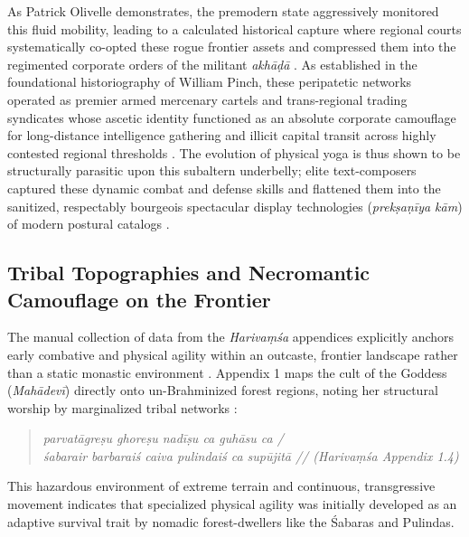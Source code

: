\documentclass[11pt,twoside,letterpaper]{article}
\begin{document}
As Patrick Olivelle demonstrates, the premodern state aggressively monitored this fluid mobility, leading to a calculated historical capture where regional courts systematically co-opted these rogue frontier assets and compressed them into the regimented corporate orders of the militant \textit{akhāḍā} \cite{Clark2006, Olivelle1987}. As established in the foundational historiography of William Pinch, these peripatetic networks operated as premier armed mercenary cartels and trans-regional trading syndicates whose ascetic identity functioned as an absolute corporate camouflage for long-distance intelligence gathering and illicit capital transit across highly contested regional thresholds \cite{Pinch1996, Pinch2012}. The evolution of physical yoga is thus shown to be structurally parasitic upon this subaltern underbelly; elite text-composers captured these dynamic combat and defense skills and flattened them into the sanitized, respectably bourgeois spectacular display technologies (\textit{prekṣaṇīya kām}) of modern postural catalogs \cite{Birch2024, Danta2015}.

\subsection{Tribal Topographies and Necromantic Camouflage on the Frontier}

The manual collection of data from the \textit{Harivaṃśa} appendices explicitly anchors early combative and physical agility within an outcaste, frontier landscape rather than a static monastic environment \cite{McCartney2026b}. Appendix 1 maps the cult of the Goddess (\textit{Mahādevī}) directly onto un-Brahminized forest regions, noting her structural worship by marginalized tribal networks \cite{HV_App}:
\begin{quote}
    \textit{parvatāgreṣu ghoreṣu nadīṣu ca guhāsu ca /} \\
    \textit{śabarair barbaraiś caiva pulindaiś ca supūjitā // (Harivaṃśa Appendix 1.4)}
\end{quote}

This hazardous environment of extreme terrain and continuous, transgressive movement indicates that specialized physical agility was initially developed as an adaptive survival trait by nomadic forest-dwellers like the Śabaras and Pulindas.
\end{document}
